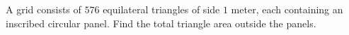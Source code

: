 A grid consists of $576$ equilateral triangles of side $1$ meter, each containing an inscribed circular panel. Find the total triangle area outside the panels.
